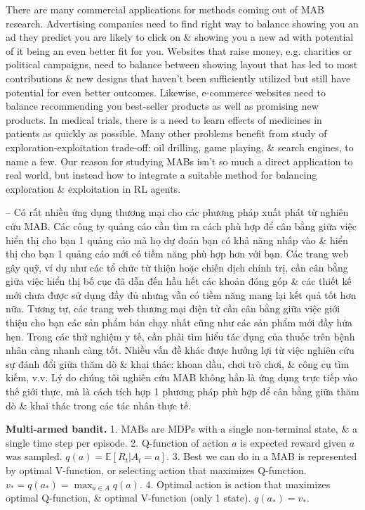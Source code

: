 \documentclass{article}
\begin{document}
\begin{itemize}
\begin{itemize}
\begin{itemize}
            There are many commercial applications for methods coming out of MAB research. Advertising companies need to find right way to balance showing you an ad they predict you are likely to click on \& showing you a new ad with potential of it being an even better fit for you. Websites that raise money, e.g. charities or political campaigns, need to balance between showing layout that has led to most contributions \& new designs that haven't been sufficiently utilized but still have potential for even better outcomes. Likewise, e-commerce websites need to balance recommending you best-seller products as well as promising new products. In medical trials, there is a need to learn effects of medicines in patients as quickly as possible. Many other problems benefit from study of exploration-exploitation trade-off: oil drilling, game playing, \& search engines, to name a few. Our reason for studying MABs isn't so much a direct application to real world, but instead how to integrate a suitable method for balancing exploration \& exploitation in RL agents.

            -- Có rất nhiều ứng dụng thương mại cho các phương pháp xuất phát từ nghiên cứu MAB. Các công ty quảng cáo cần tìm ra cách phù hợp để cân bằng giữa việc hiển thị cho bạn 1 quảng cáo mà họ dự đoán bạn có khả năng nhấp vào \& hiển thị cho bạn 1 quảng cáo mới có tiềm năng phù hợp hơn với bạn. Các trang web gây quỹ, ví dụ như các tổ chức từ thiện hoặc chiến dịch chính trị, cần cân bằng giữa việc hiển thị bố cục đã dẫn đến hầu hết các khoản đóng góp \& các thiết kế mới chưa được sử dụng đầy đủ nhưng vẫn có tiềm năng mang lại kết quả tốt hơn nữa. Tương tự, các trang web thương mại điện tử cần cân bằng giữa việc giới thiệu cho bạn các sản phẩm bán chạy nhất cũng như các sản phẩm mới đầy hứa hẹn. Trong các thử nghiệm y tế, cần phải tìm hiểu tác dụng của thuốc trên bệnh nhân càng nhanh càng tốt. Nhiều vấn đề khác được hưởng lợi từ việc nghiên cứu sự đánh đổi giữa thăm dò \& khai thác: khoan dầu, chơi trò chơi, \& công cụ tìm kiếm, v.v. Lý do chúng tôi nghiên cứu MAB không hẳn là ứng dụng trực tiếp vào thế giới thực, mà là cách tích hợp 1 phương pháp phù hợp để cân bằng giữa thăm dò \& khai thác trong các tác nhân thực tế.

            {\bf Multi-armed bandit.} 1. MABs are MDPs with a single non-terminal state, \& a single time step per episode. 2. Q-function of action $a$ is expected reward given $a$ was sampled. $q(a) = \mathbb{E}[R_t|A_t = a]$. 3. Best we can do in a MAB is represented by optimal V-function, or selecting action that maximizes Q-function. $v_* = q(a_*) = \max_{a\in A} q(a)$. 4. Optimal action is action that maximizes optimal Q-function, \& optimal V-function (only 1 state). $q(a_*) = v_*$.


\end{itemize}
\end{itemize}
\end{itemize}
\end{document}
